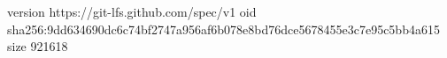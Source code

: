 version https://git-lfs.github.com/spec/v1
oid sha256:9dd634690dc6c74bf2747a956af6b078e8bd76dce5678455e3c7e95c5bb4a615
size 921618
